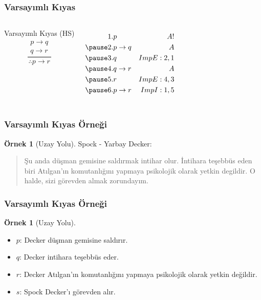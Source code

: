 \documentclass[dvipsnames]{beamer}
\theoremstyle{definition}
\theoremstyle{example}
\newtheorem{ornek}[theorem]{Örnek}
\theoremstyle{plain}
\begin{document}
\begin{frame}
  \frametitle{Varsayımlı Kıyas}

  \begin{columns}
    \begin{block}{Varsayımlı Kıyas (HS)}
      \[
      \frac
        {
          \begin{array}{c}
            p \rightarrow q\\
            q \rightarrow r
          \end{array}}
        {
          \therefore p \rightarrow r
        }
      \]
    \end{block}

    \pause
    \begin{eqnarray*}
      1. & p               & A!\\
      \pause
      2. & p \rightarrow q & A\\
      \pause
      3. & q               & ImpE:2,1\\
      \pause
      4. & q \rightarrow r & A\\
      \pause
      5. & r               & ImpE:4,3\\
      \pause
      6. & p \rightarrow r & ImpI:1,5\\
    \end{eqnarray*}
  \end{columns}
\end{frame}

\begin{frame}
  \frametitle{Varsayımlı Kıyas Örneği}

  \begin{ornek}[Uzay Yolu]
    Spock - Yarbay Decker:
    \begin{quote}
      Şu anda düşman gemisine saldırmak intihar olur. İntihara teşebbüs eden
      biri Atılgan'ın komutanlığını yapmaya psikolojik olarak yetkin degildir.
      O halde, sizi görevden almak zorundayım.
    \end{quote}
  \end{ornek}
\end{frame}

\begin{frame}
  \frametitle{Varsayımlı Kıyas Örneği}

  \begin{ornek}[Uzay Yolu]
    \begin{itemize}
      \item $p$: Decker düşman gemisine saldırır.
      \item $q$: Decker intihara teşebbüs eder.
      \item $r$: Decker Atılgan'ın komutanlığını yapmaya psikolojik olarak
        yetkin değildir.
      \item $s$: Spock Decker'ı görevden alır.
    \end{itemize}
  \end{ornek}
\end{frame}
\end{document}
